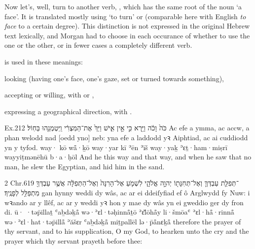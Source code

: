 
\begin{paper}
	Now let’s, well, turn to another verb, , which has the same root of the noun  ‘a face’. It is translated mostly using  ‘to turn’ or  (comparable here with English \textit{to face} to a certain degree). This distinction is not expressed in the original Hebrew text lexically, and Morgan had to choose in each occurance of  whether to use the one or the other, or in fewer cases a completely different verb.
\end{paper}

\begin{paper}
	 is used in these meanings:
	\begin{compactitem}
		\item looking (having one’s face, one’s gaze, set or turned towards something),
		\item accepting or willing, with  or ,
		\item expressing a geographical direction, with .
	\end{compactitem}
\end{paper}

\begin{example}{Ex.}{2}{12}{}{}
	\quoling
	{ כֹּה֙ וָכֹ֔ה וַיַּ֖רְא כִּ֣י אֵ֣ין אִ֑ישׁ וַיַּךְ֙ אֶת־הַמִּצְרִ֔י וַֽיִּטְמְנֵ֖הוּ בַּחֽוֹל׃}
	{Ac efe a  ymma, ac accw, a phan welodd nad [oedd yno] neb: yna efe a laddodd yꝛ Aiphtiad, ac ai cuddiodd yn y tyfod.}
	{way· kō wå̄·ḵō way·yar kī ʾēn ʾīš way·yaḵ ʾɛṯ·ham·miṣrī wayyiṭmənēhū b·a·ḥōl}
	{And he  this way and that way, and when he saw that  no man, he slew the Egyptian, and hid him in the sand.}
\end{example}

\begin{example}{2 Chr.}{6}{19}{}{}
	\quoling
	{ ־תְּפִלַּ֧ת עַבְדְּךָ֛ וְאֶל־תְּחִנָּת֖וֹ יְהוָ֣ה אֱלֹהָ֑י לִשְׁמֹ֤עַ אֶל־הָרִנָּה֙ וְאֶל־הַתְּפִלָּ֔ה אֲשֶׁ֥ר עַבְדְּךָ֖ מִתְפַּלֵּ֥ל לְפָנֶֽיךָ׃}
	{ gan hynny  weddi dy wâs, ac ar ei ddeiſyfiad ef ô Arglwydd fy Nuw: i wꝛando ar y llêf, ac ar y weddi yꝛ hon y mae dy wâs yn ei gweddio ger dy fron di.}
	{ū· ·təp̄illaṯ ʿaḇdəḵå̄ wə·ʾɛl·təḥinnå̄ṯō {\YHWH} ʾɛ̆lōhå̄y li·šmōaʿ ʾɛl·hå̄·rinnå̄ wə·ʾɛl·hat·təp̄illå̄ ʾăšɛr ʿaḇdəḵå̄ miṯpallēl lə·p̄å̄nɛḵå̄}
	{ therefore  the prayer of thy servant, and to his supplication, O {\LORD} my God, to hearken unto the cry and the prayer which thy servant prayeth before thee:}
\end{example}

